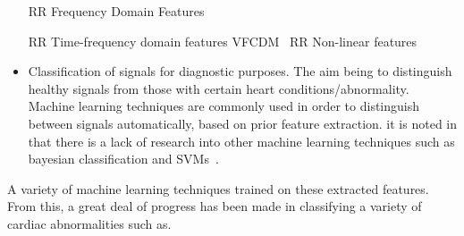 \documentclass[titlepage]{scrartcl}
\begin{document}
\begin{itemize}
        RR Frequency Domain Features
        
        RR Time-frequency domain features VFCDM~\parencite{Dash2009}
        RR Non-linear features
        ~\parencite{Yaghouby2009}

        

    \item Classification of signals for diagnostic purposes. The aim being to
        distinguish healthy signals from those with certain heart
        conditions/abnormality. Machine learning techniques are commonly used
        in order to distinguish between signals automatically, based on prior
        feature extraction. 
        it is noted in  that there is a lack of research into other machine
        learning techniques such as bayesian classification and
        SVMs~\citeyearpar{}.
\end{itemize}



        
A variety of machine learning techniques trained on these extracted
features. From this, a great deal of progress has been made in classifying a
variety of cardiac abnormalities such as. 

\pagebreak{}
\printbibliography{}
\end{document}
